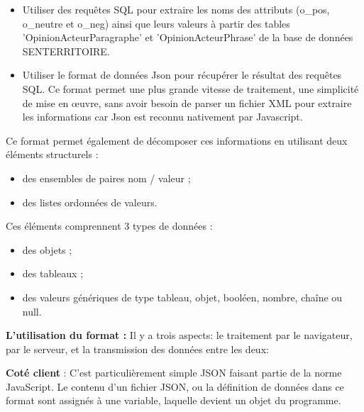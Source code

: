 \begin{itemize}

\item Utiliser des requêtes SQL pour extraire les noms des attributs (o\_pos, o\_neutre et o\_neg) ainsi que leurs valeurs à partir des tables 'OpinionActeurParagraphe' et 'OpinionActeurPhrase' de la base de données SENTERRITOIRE. 

\item Utiliser le format de données Json pour récupérer le résultat des requêtes SQL. Ce format permet une plus grande vitesse de traitement, une simplicité de mise en œuvre, sans avoir besoin de parser un fichier XML pour extraire les informations car Json est reconnu nativement par Javascript.\\ 

\end{itemize}

Ce format permet également de décomposer ces informations en utilisant deux éléments structurels :


\begin{itemize}

\item   des ensembles de paires nom / valeur ;
\item   des listes ordonnées de valeurs. \\

\end{itemize}

Ces éléments comprennent 3 types de données :

\begin{itemize}

\item   des objets ;
\item   des tableaux ;
\item   des valeurs génériques de type tableau, objet, booléen, nombre, chaîne ou null.\\

\end{itemize}

\textbf{L'utilisation du format :} Il y a trois aspects: le traitement par le navigateur, par le serveur, et la transmission des données entre les deux:



\textbf{Coté client} : C'est particulièrement simple JSON faisant partie de la norme JavaScript. Le contenu d'un fichier JSON, ou la définition de données dans ce format sont assignés à une variable, laquelle devient un objet du programme.



